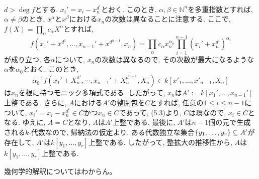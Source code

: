 \documentclass[dvipdfmx]{jsarticle}
\begin{document}
\begin{problem}
\begin{enumerate}
            $d > \deg{f}$とする.
            $x_i' = x_i - x_n^{d^i}$とおく.
            このとき, $\alpha, \beta \in \mathbb{N}^n$を多重指数とすれば,
            $\alpha \neq \beta$のとき, $x^\alpha$と$x^\beta$における$x_n$の次数は異なることに注意する.
            ここで, $f(X) = \prod_{\alpha} c_{\alpha} X^\alpha$とすれば,
            \[
                f(x_1' + x^{d^1}, \dots, x_{n-1}' + x^{d^{n-1}}, x_n) = \prod_{\alpha} c_\alpha x_n^{\alpha_n} \prod_{i = 1}^{n-1} (x_i' + x_n^{d^i})^{\alpha_i}
            \]
            が成り立つ.
            各$\alpha$について, $x_n$の次数は異なるので, その次数が最大になるような$\alpha$を$\alpha_0$とおく.
            このとき,
            \[
                \alpha_0^{-1}f(x_1' + X^{d^1}_n, \cdots, x_{n-1}' + X_n^{d^{n-1}}, X_n) \in k[x'_1,\dots,x'_{n-1}, X_n]
            \]
            は$x_n$を根に持つモニック多項式である.
            したがって, $x_n$は$A' := k[x_1', \dots, x_{n-1}']$上整である.
            さらに, $A$における$A'$の整閉包を$C$とすれば,
            任意の$1 \leq i \leq n-1$について,
            $x_i' = x_i - x_n^{d^i} \in C$かつ$x_n \in C$であって, (5.3)より, $C$は環なので,
            $x_i \in C$となる.
            ゆえに, $A = C$となり, $A$は$A'$上整である.
            最後に, $A'$は$n-1$個の元で生成される$k$-代数なので, 帰納法の仮定より,
            ある代数独立な集合$\{y_1, \dots, y_r\} \subseteq A'$が存在して,
            $A'$は$k[y_1, \dots, y_r]$上整である.
            したがって, 整拡大の推移性から, $A$は$k[y_1, \dots, y_r]$上整である.
        \end{enumerate}
        \color{red}
        幾何学的解釈についてはわからん。
        \color{black}
    \end{problem}
\end{document}
